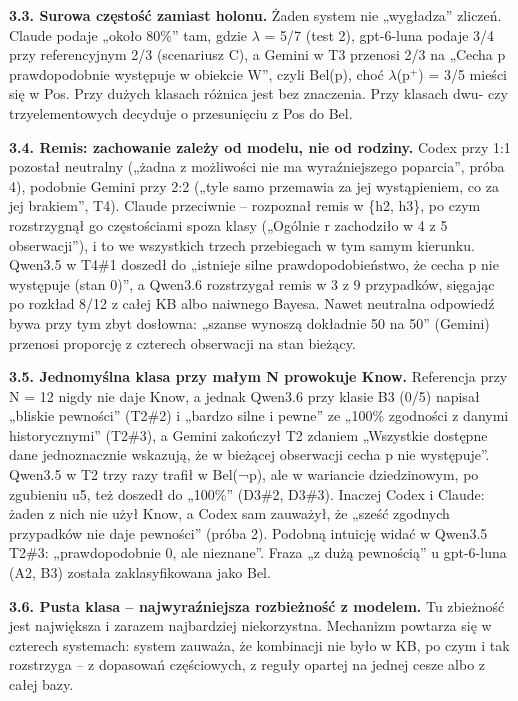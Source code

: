 \documentclass[
  polish,
]{article}
\begin{document}
\textbf{3.3. Surowa częstość zamiast holonu.} Żaden system nie
„wygładza'' zliczeń. Claude podaje „około 80\%'' tam, gdzie \(\lambda\)
= 5/7 (test 2), gpt-6-luna podaje 3/4 przy referencyjnym 2/3 (scenariusz
C), a Gemini w T3 przenosi 2/3 na „Cecha p prawdopodobnie występuje w
obiekcie W'', czyli Bel(p), choć \(\lambda\)(p\(^{+}\)) = 3/5 mieści się
w Pos. Przy dużych klasach różnica jest bez znaczenia. Przy klasach dwu-
czy trzyelementowych decyduje o przesunięciu z Pos do Bel.

\textbf{3.4. Remis: zachowanie zależy od modelu, nie od rodziny.} Codex
przy 1:1 pozostał neutralny („żadna z możliwości nie ma wyraźniejszego
poparcia'', próba 4), podobnie Gemini przy 2:2 („tyle samo przemawia za
jej wystąpieniem, co za jej brakiem'', T4). Claude przeciwnie --
rozpoznał remis w \{h2, h3\}, po czym rozstrzygnął go częstościami spoza
klasy („Ogólnie r zachodziło w 4 z 5 obserwacji''), i to we wszystkich
trzech przebiegach w tym samym kierunku. Qwen3.5 w T4\#1 doszedł do
„istnieje silne prawdopodobieństwo, że cecha p nie występuje (stan 0)'',
a Qwen3.6 rozstrzygał remis w 3 z 9 przypadków, sięgając po rozkład 8/12
z całej KB albo naiwnego Bayesa. Nawet neutralna odpowiedź bywa przy tym
zbyt dosłowna: „szanse wynoszą dokładnie 50 na 50'' (Gemini) przenosi
proporcję z czterech obserwacji na stan bieżący.

\textbf{3.5. Jednomyślna klasa przy małym N prowokuje Know.} Referencja
przy N = 12 nigdy nie daje Know, a jednak Qwen3.6 przy klasie B3 (0/5)
napisał „bliskie pewności'' (T2\#2) i „bardzo silne i pewne'' ze „100\%
zgodności z danymi historycznymi'' (T2\#3), a Gemini zakończył T2
zdaniem „Wszystkie dostępne dane jednoznacznie wskazują, że w bieżącej
obserwacji cecha p nie występuje''. Qwen3.5 w T2 trzy razy trafił w
Bel(¬p), ale w wariancie dziedzinowym, po zgubieniu u5, też doszedł do
„100\%'' (D3\#2, D3\#3). Inaczej Codex i Claude: żaden z nich nie użył
Know, a Codex sam zauważył, że „sześć zgodnych przypadków nie daje
pewności'' (próba 2). Podobną intuicję widać w Qwen3.5 T2\#3:
„prawdopodobnie 0, ale nieznane''. Fraza „z dużą pewnością'' u
gpt-6-luna (A2, B3) została zaklasyfikowana jako Bel.

\textbf{3.6. Pusta klasa -- najwyraźniejsza rozbieżność z modelem.} Tu
zbieżność jest największa i zarazem najbardziej niekorzystna. Mechanizm
powtarza się w czterech systemach: system zauważa, że kombinacji nie
było w KB, po czym i tak rozstrzyga -- z dopasowań częściowych, z reguły
opartej na jednej cesze albo z całej bazy.
\end{document}
